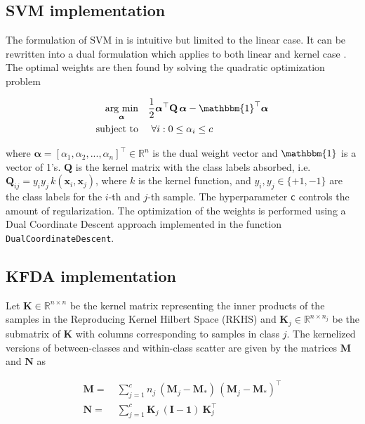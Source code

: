 \documentclass[utf8]{frontiersSCNS} %
\newcommand{\al}{\boldsymbol{\alpha}}
\newcommand{\x}{\mathbf{x}}
\newcommand{\K}{\mathbf{K}}
\newcommand{\M}{\mathbf{M}}
\newcommand{\Q}{\mathbf{Q}}
\newcommand{\R}{\mathbb{R}}
\newcommand{\ttt}[1]{\texttt{#1}}
\begin{document}
\subsection{SVM implementation}\label{sec:svm_implementation}

The formulation of SVM in  is intuitive but limited to the linear case. It can be rewritten into a dual formulation which applies to both linear and kernel case  \citep{Hsieh2008ASVM}. The optimal weights are then found by solving the quadratic optimization problem

\begin{align}
\begin{split}
\label{eq:svm_dual_loss_function}
\underset{\al}{\text{arg min}}\quad
& \frac{1}{2} \al^\top\Q\,\al - \mathbbm{1}^\top\al\\
\text{subject to}\quad  &\ \forall i: 0 \le \alpha_i \le c
\end{split}
\end{align}

where $\al=[\alpha_1,\alpha_2,...,\alpha_n]^\top\in\R^n$ is the dual weight vector and  $\mathbbm{1}$ is a vector of 1's. $\Q$ is the kernel matrix with the class labels absorbed, i.e. $\Q_{ij} = y_i y_j\, k(\x_i,\x_j)$, where $k$ is the kernel function, and $y_i, y_j \in\{+1, -1\}$ are the class labels for the $i$-th and $j$-th sample. The hyperparameter \ttt{c} controls the amount of regularization. The optimization of the weights is performed using a Dual Coordinate Descent approach  \citep{Hsieh2008ASVM} implemented in the function \ttt{DualCoordinateDescent}.


\subsection{KFDA implementation}

Let $\K\in\R^{n\times n}$ be the kernel matrix representing the inner products of the samples in the Reproducing Kernel Hilbert Space (RKHS) and $\K_j\in\R^{n \times n_j}$ be the submatrix of $\K$ with columns corresponding to samples in class $j$. The kernelized versions of between-classes and within-class scatter are given by the matrices $\M$ and $\mathbf{N}$ as


\begin{equation}
\label{eq:kernelFDA}
\begin{alignedat}{2}
\M =\ &  \sum_{j=1}^c n_j\ (\M_j - \M_*)\,(\M_j-\M_*)^\top\\
\mathbf{N} =\ & \sum_{j=1}^c \K_j\ (\mathbf{I} - \mathbf{1})\  \K_j^\top
\end{alignedat}
\end{equation}
\end{document}

